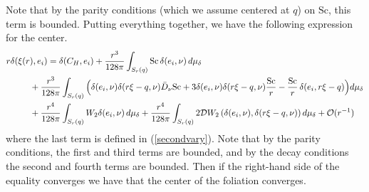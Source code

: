 \documentclass[12pt,a4paper]{amsart}
\theoremstyle{plain}
\theoremstyle{definition}
\begin{document}
Note that by the parity conditions (which we assume centered at $q$) on $\mathrm{Sc}$, this term is bounded. 
Putting everything together, we have the following expression for the center. 
\begin{equation}
    \begin{split}
        r \delta(  \xi(r&), e_i ) =  \delta(  C_H, e_i )+ \frac{r^3}{128 \pi}  \int_{S_r(q)} \mathrm{Sc} \, \delta( e_i, \nu )   \, d\mu_{\delta} \\
        &+\frac{r^3}{128 \pi}  \int_{S_r(q)}  \Big(  \delta( e_i, \nu )  \delta(  r\xi-q, \nu ) \Bar{D}_{\nu} \mathrm{Sc}+ 3 \delta( e_i, \nu ) \delta(  r\xi-q, \nu ) \frac{\mathrm{Sc}}{r}  - \frac{\mathrm{Sc}}{r} \, \delta( e_i,r\xi-q ) \Big)  d\mu_{\delta} \\
       &+ \frac{r^4}{128 \pi}  \int_{S_r(q)}  W_2 \delta( e_i, \nu )  \, d\mu_{\delta} +\frac{r^4}{128 \pi}  \int_{S_{r}(q)}   2 \mathcal{D}W_2\left( \delta( e_i, \nu ), \delta( r\xi-q, \nu ) \right) d\mu_{\delta} + \mathcal{O}(r^{-1})
    \end{split}
\end{equation}
where the last term is defined in (\ref{secondvary}). Note that by the parity conditions, the first and third terms are bounded, and by the decay conditions the second and fourth terms are bounded. Then if the right-hand side of the equality converges we have that the center of the foliation converges. 
\end{document}
